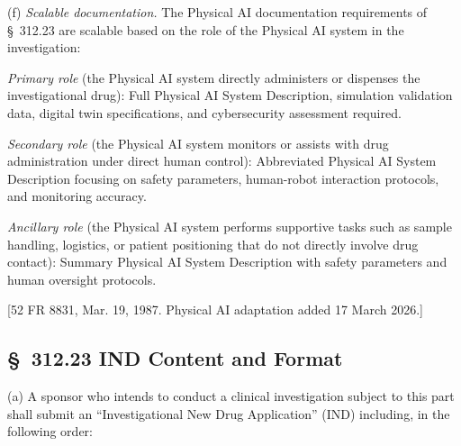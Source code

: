 \documentclass[11pt]{article}
\begin{document}
(f) \textit{Scalable documentation.} The Physical AI documentation requirements of \S~312.23 are scalable based on the role of the Physical AI system in the investigation:

\begin{description}[leftmargin=0.8cm,style=sameline]
\item[(i)] \textit{Primary role} (the Physical AI system directly administers or dispenses the investigational drug): Full Physical AI System Description, simulation validation data, digital twin specifications, and cybersecurity assessment required.
\item[(ii)] \textit{Secondary role} (the Physical AI system monitors or assists with drug administration under direct human control): Abbreviated Physical AI System Description focusing on safety parameters, human-robot interaction protocols, and monitoring accuracy.
\item[(iii)] \textit{Ancillary role} (the Physical AI system performs supportive tasks such as sample handling, logistics, or patient positioning that do not directly involve drug contact): Summary Physical AI System Description with safety parameters and human oversight protocols.
\end{description}

[52 FR 8831, Mar. 19, 1987. Physical AI adaptation added 17 March 2026.]

\subsection{\S~312.23 IND Content and Format}

(a) A sponsor who intends to conduct a clinical investigation subject to this part shall submit an ``Investigational New Drug Application'' (IND) including, in the following order:
\end{document}
